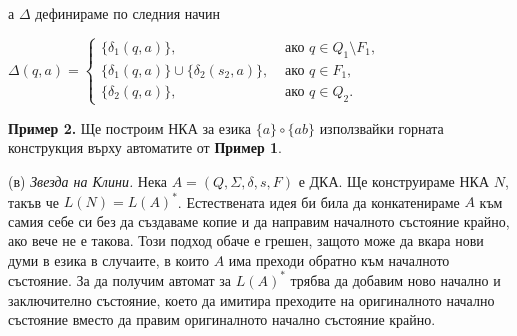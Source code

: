 \documentclass{article}
\begin{document}
     а $\Delta$ дефинираме по следния начин

     \begin{center}
        $\Delta(q,a) =
        \begin{cases}
          \{\delta_1(q,a)\}, & \text { ако } q \in Q_1 \setminus F_1, \\
          \{\delta_1(q,a)\} \cup \{\delta_2(s_2,a)\}, & \text { ако } q \in F_1, \\
          \{\delta_2(q,a)\}, & \text { ако } q \in Q_2.
        \end{cases}$
     \end{center}


\vspace{15pt}

\textbf{Пример 2.} Ще построим НКА за езика $\{a\} \circ \{ab\}$ използвайки 
горната конструкция върху автоматите от \textbf{Пример 1}.
\vspace{25pt}

\begin{center}
    \end{center}

\vspace{15pt}

(в) \textit{Звезда на Клини.} Нека $A = (Q,\Sigma,\delta,s,F)$ е ДКА. Ще конструираме
НКА $N$, такъв че $L(N) = L(A)^*$. Естествената идея би била да конкатенираме 
$A$ към самия себе си без да създаваме копие и да направим началното състояние крайно, ако вече не е 
такова. Този подход обаче е грешен, защото може да вкара нови думи в езика в случаите,
в които $A$ има преходи обратно към началното състояние.
За да получим автомат за $L(A)^*$ трябва да добавим ново начално и заключително състояние,
което да имитира преходите на оригиналното начално състояние вместо да правим оригиналното
начално състояние крайно. \\
\end{document}
